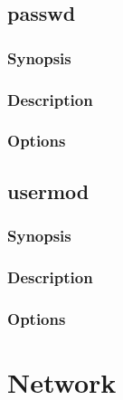 \documentclass[a4paper, 10pt, onecolumn, openright, oneside]{book}
\begin{document}
		\section{passwd}
			\subsection{Synopsis}
			\subsection{Description}
			\subsection{Options}
		\section{usermod}
			\subsection{Synopsis}
			\subsection{Description}
			\subsection{Options}
	\chapter{Network}
\end{document}
